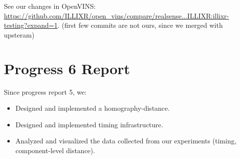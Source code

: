 \documentclass[sigconf,screen]{acmart}
\begin{document}
See our changes in OpenVINS:
\url{https://github.com/ILLIXR/open\_vins/compare/realsense...ILLIXR:illixr-testing?expand=1}.
(first few commits are not ours, since we merged with upsteram)

\section{Progress 6 Report}

Since progress report 5, we:

\begin{itemize}
\item Designed and implemented a homography-distance.
\item Designed and implemented timing infrastructure.
\item Analyzed and visualized the data collected from our experiments (timing, component-level distance).
\end{itemize}
\end{document}
